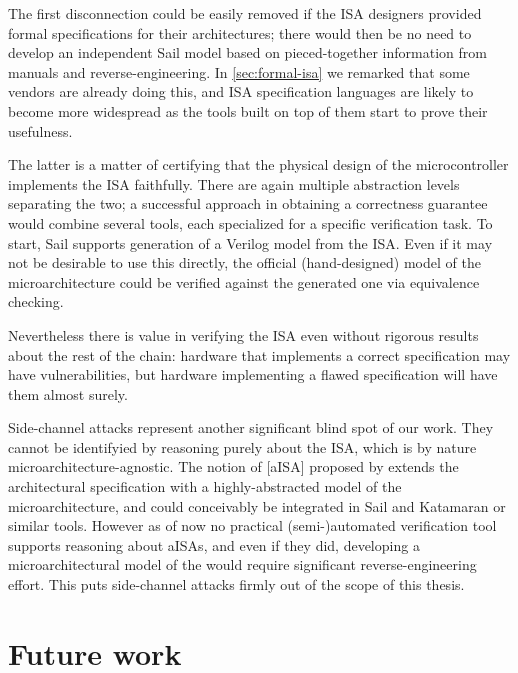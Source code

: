 The first disconnection could be easily removed if the ISA designers provided formal specifications for their architectures; there would then be no need to develop an independent Sail model based on pieced-together information from manuals and reverse-engineering. In \cref{sec:formal-isa} we remarked that some vendors are already doing this, and ISA specification languages are likely to become more widespread as the tools built on top of them start to prove their usefulness.

The latter is a matter of certifying that the physical design of the microcontroller implements the ISA faithfully. There are again multiple abstraction levels separating the two; a successful approach in obtaining a correctness guarantee would combine several tools, each specialized for a specific verification task. To start, Sail supports generation of a Verilog model from the ISA. Even if it may not be desirable to use this directly, the official (hand-designed) model of the microarchitecture could be verified against the generated one via equivalence checking.


Nevertheless there is value in verifying the ISA even without rigorous results about the rest of the chain: hardware that implements a correct specification may have vulnerabilities, but hardware implementing a flawed specification will have them almost surely.

Side-channel attacks represent another significant blind spot of our work. They cannot be identifyied by reasoning purely about the ISA, which is by nature microarchitecture-agnostic. The notion of [aISA] proposed by \cite{Ge2018} extends the architectural specification with a highly-abstracted model of the microarchitecture, and could conceivably be integrated in Sail and Katamaran or similar tools. However as of now no practical (semi-)automated verification tool supports reasoning about aISAs, and even if they did, developing a microarchitectural model of the \msp would require significant reverse-engineering effort. This puts side-channel attacks firmly out of the scope of this thesis.

\section{Future work}

